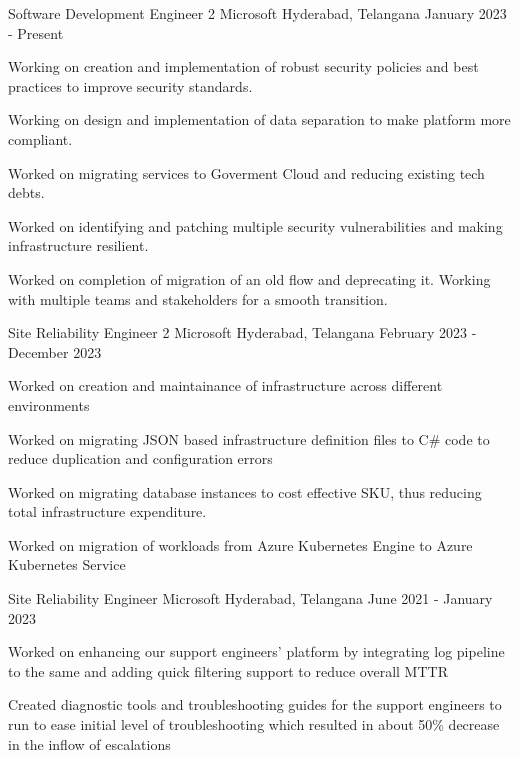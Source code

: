 
\begin{cventries}
  \cventry
  { Software Development Engineer 2}
  {Microsoft}
  {Hyderabad, Telangana}
  { January 2023 - Present}
  {
  \begin{cvitems}
      \item {Working on creation and implementation of robust security policies and best practices to improve security standards.}
      \item {Working on design and implementation of data separation to make platform more compliant.}
      \item {Worked on migrating services to Goverment Cloud and reducing existing tech debts.}
      \item {Worked on identifying and patching multiple security vulnerabilities and making infrastructure resilient.}
      \item {Worked on completion of migration of an old flow and deprecating it. Working with multiple teams and stakeholders for a smooth transition.}
  \end{cvitems}
  }
  \cventry
  {Site Reliability Engineer 2} %
  {Microsoft} %
  {Hyderabad, Telangana} %
  {February 2023 - December 2023} %
  {
  \begin{cvitems} %
  \item {Worked on creation and maintainance of infrastructure across different environments}  
  \item {Worked on migrating JSON based infrastructure definition files to C\# code to reduce duplication and configuration errors}
  \item {Worked on migrating database instances to cost effective SKU, thus reducing total infrastructure expenditure.}
  \item {Worked on migration of workloads from Azure Kubernetes Engine to Azure Kubernetes Service}
  \end{cvitems}
  }
  \cventry
  {Site Reliability Engineer} %
  {Microsoft} %
  {Hyderabad, Telangana} %
  {June 2021 - January 2023} %
  {
  \begin{cvitems} %
  \item {Worked on enhancing our support engineers' platform by integrating log pipeline to the same and adding quick filtering support to reduce overall MTTR}
  \item {Created diagnostic tools and troubleshooting guides for the support engineers to run to ease initial level of troubleshooting which resulted in about 50\% decrease in the inflow of escalations}

\end{cvitems}}
\end{cventries}
